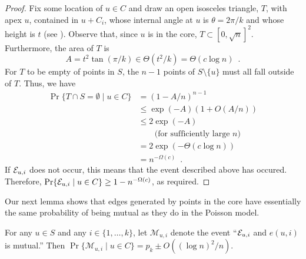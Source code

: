 \documentclass[twoside,leqno,twocolumn]{article}
\begin{document}
\begin{proof}
  Fix some location of $u\in C$ and draw an open isosceles triangle,
  $T$, with apex $u$, contained in $u+C_i$, whose internal angle at
  $u$ is $\theta=2\pi/k$ and whose height is $t$ (see ).
  Observe that, since $u$ is in the core, $T\subset [0,\sqrt{n}]^2$.
  Furthermore, the area of $T$
  is 
  \[ 
     A = t^2\tan(\pi/k)\in \Theta(t^2/k) = \Theta(c\log n) \enspace .
  \]
  For $T$ to be empty of points in $S$, the $n-1$ points of $S\setminus\{u\}$
  must all fall outside of $T$.  Thus, we have
  \begin{align*}
    \Pr\{T\cap S=\emptyset\mid u\in C\} 
       & = (1-A/n)^{n-1} \\
       & \le \exp(-A)(1+O(A/n)) \\
       & \le 2\exp(-A) \\ & \qquad \text{(for sufficiently large $n$)}\\
       & = 2\exp(-\Theta(c\log n)) \\
       & = n^{-\Omega(c)} \enspace .
  \end{align*}
  If $\mathcal{E}_{u,i}$ does not occur, this means that the event described above
  has occured.  Therefore, $\Pr\{\mathcal{E}_{u,i}\mid u\in C\}\ge 1-n^{-\Omega(c)}$,
  as required.
\end{proof}

\newcommand{\mui}{\mathcal{M}_{u,i}}

Our next lemma shows that edges generated by points in the core have
essentially the same probability of being mutual as they do in the
Poisson model.

\begin{lem}
    For any $u\in S$ and any $i\in\{1,\ldots,k\}$, let $\mui$ denote the
    event ``$\mathcal{E}_{u,i}$ and $e(u,i)$ is mutual.'' Then $\Pr\{\mui\mid u\in C\}
    = p_k\pm O((\log n)^2/n)$.
\end{lem}
\end{document}
